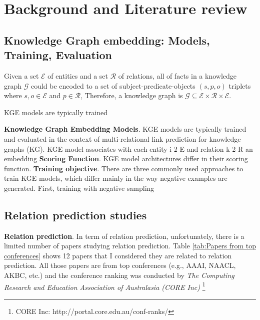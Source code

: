 
\chapter{Background and Literature review}




\section{Knowledge Graph embedding: Models, Training, Evaluation}

Given a set $\mathcal{E}$ of entities and a set $\mathcal{R}$ of relations, all of facts in a knowledge graph $\mathcal{G}$ could be encoded to a set of subject-predicate-objects $(s,p,o)$ triplets where $s, o \in \mathcal{E}$ and $p \in \mathcal{R}$, Therefore, a knowledge graph is $\mathcal{G} \subseteq \mathcal{E} \times \mathcal{R} \times \mathcal{E}$.

KGE models are typically trained 


\noindent\textbf{Knowledge Graph Embedding Models}. KGE models are typically trained and evaluated in the context of multi-relational link prediction for knowledge graphs (KG). KGE model associates with each entity i 2 E and relation
k 2 R an embedding
\newline
\noindent\textbf{Scoring Function}. KGE model architectures differ in their scoring function.
\newline
\noindent\textbf{Training objective}. There are three commonly used approaches to train KGE models, which differ
mainly in the way negative examples are generated. First, training with negative sampling

\section{Relation prediction studies}
\noindent\textbf{Relation prediction}. In term of relation prediction, unfortunately, there is a limited number of papers studying relation prediction. Table \ref{tab:Papers from top conferences} shows 12 papers that I considered they are related to relation prediction. All those papers are from top conferences (e.g., AAAI, NAACL, AKBC, etc.) and the conference ranking was conducted by \textit{The Computing Research and Education Association of Australasia (CORE Inc)} \footnote{CORE Inc: http://portal.core.edu.au/conf-ranks/}


